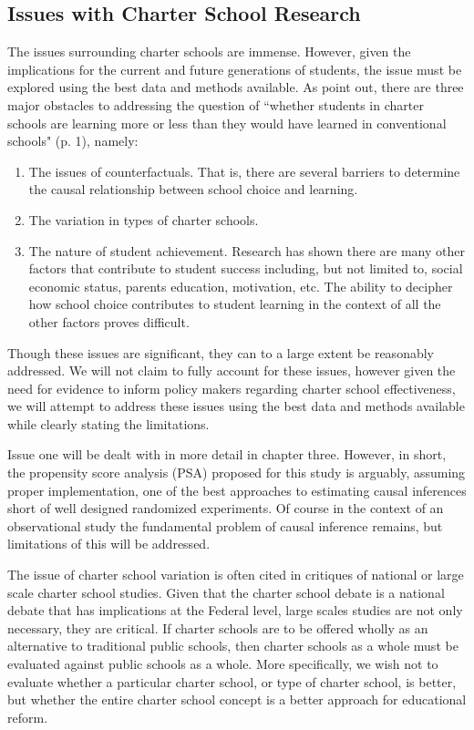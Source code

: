 \documentclass[letterpaper,12p,twoside]{article} %
\begin{document}
\subsection{Issues with Charter School Research}
The issues surrounding charter schools are immense. However, given the implications for the current and future generations of students, the issue must be explored using the best data and methods available. As  point out, there are three major obstacles to addressing the question of ``whether students in charter schools are learning more or less than they would have learned in conventional schools" (p. 1), namely:

\begin{enumerate}
\item The issues of counterfactuals. That is, there are several barriers to determine the causal relationship between school choice and learning.
\item The variation in types of charter schools.
\item The nature of student achievement. Research has shown there are many other factors that contribute to student success including, but not limited to, social economic status, parents education, motivation, etc. The ability to decipher how school choice contributes to student learning in the context of all the other factors proves difficult.
\end{enumerate}

Though these issues are significant, they can to a large extent be reasonably addressed. We will not claim to fully account for these issues, however given the need for evidence to inform policy makers regarding charter school effectiveness, we will attempt to address these issues using the best data and methods available while clearly stating the limitations.

Issue one will be dealt with in more detail in chapter three. However, in short, the propensity score analysis (PSA) proposed for this study is arguably, assuming proper implementation, one of the best approaches to estimating causal inferences short of well designed randomized experiments. Of course in the context of an observational study the fundamental problem of causal inference  remains, but limitations of this will be addressed.

The issue of charter school variation is often cited in critiques of national or large scale charter school studies. Given that the charter school debate is a national debate that has implications at the Federal level, large scales studies are not only necessary, they are critical. If charter schools are to be offered wholly as an alternative to traditional public schools, then charter schools as a whole must be evaluated against public schools as a whole. More specifically, we wish not to evaluate whether a particular charter school, or type of charter school, is better, but whether the entire charter school concept is a better approach for educational reform.
\end{document}
